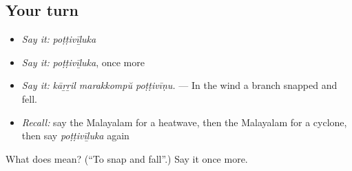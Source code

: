 \subsection*{Your turn}
\begin{itemize}
\raggedright
  \item \emph{Say it:} \emph{poṭṭivīḻuka}
  \item \emph{Say it:} \emph{poṭṭivīḻuka}, once more
  \item \emph{Say it:} \emph{kāṟṟil marakkompŭ poṭṭivīṇu.} — In the wind a branch snapped and fell.
  \item \emph{Recall:} say the Malayalam for a heatwave, then the Malayalam for a cyclone, then say \emph{poṭṭivīḻuka} again
\end{itemize}

\begin{tcolorbox}[breakable,colback=teal!4,colframe=teal!35!black,title={Before you move on}]
What does  mean? (\textquotedblleft{}To snap and fall\textquotedblright{}.) Say it once more.
\end{tcolorbox}

